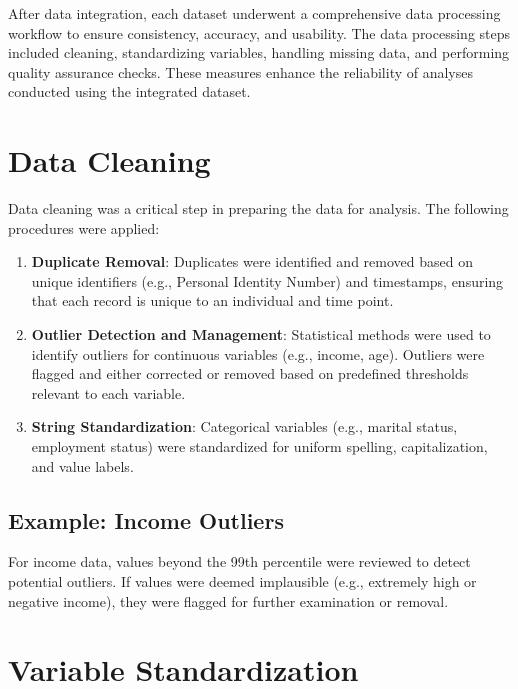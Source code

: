 \documentclass[
]{book}
\providecommand{\tightlist}{%
  \setlength{\itemsep}{0pt}\setlength{\parskip}{0pt}}
\begin{document}
After data integration, each dataset underwent a comprehensive data processing workflow to ensure consistency, accuracy, and usability. The data processing steps included cleaning, standardizing variables, handling missing data, and performing quality assurance checks. These measures enhance the reliability of analyses conducted using the integrated dataset.

\hypertarget{data-cleaning}{%
\section{Data Cleaning}\label{data-cleaning}}

Data cleaning was a critical step in preparing the data for analysis. The following procedures were applied:

\begin{enumerate}
\def\labelenumi{\arabic{enumi}.}
\tightlist
\item
  \textbf{Duplicate Removal}: Duplicates were identified and removed based on unique identifiers (e.g., Personal Identity Number) and timestamps, ensuring that each record is unique to an individual and time point.
\item
  \textbf{Outlier Detection and Management}: Statistical methods were used to identify outliers for continuous variables (e.g., income, age). Outliers were flagged and either corrected or removed based on predefined thresholds relevant to each variable.
\item
  \textbf{String Standardization}: Categorical variables (e.g., marital status, employment status) were standardized for uniform spelling, capitalization, and value labels.
\end{enumerate}

\hypertarget{example-income-outliers}{%
\subsection{Example: Income Outliers}\label{example-income-outliers}}

For income data, values beyond the 99th percentile were reviewed to detect potential outliers. If values were deemed implausible (e.g., extremely high or negative income), they were flagged for further examination or removal.

\hypertarget{variable-standardization}{%
\section{Variable Standardization}\label{variable-standardization}}
\end{document}
